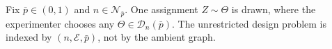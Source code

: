 Fix \(\bar p\in(0,1)\) and \(n\in\mathcal N_{\bar p}\). One assignment \(Z\sim\Theta\) is drawn, where the experimenter chooses any \(\Theta\in\mathcal D_n(\bar p)\). The unrestricted design problem is indexed by \((n,\mathcal E,\bar p)\), not by the ambient graph.